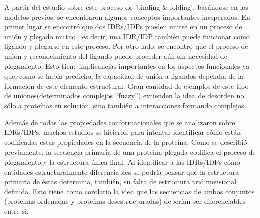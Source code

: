 A partir del estudio sobre este proceso de 'binding \& folding', basándose en los modelos previos, se encontraron algunos conceptos importantes inesperados.
En primer lugar se encontró que dos IDRs/IDPs pueden unirse en un proceso de unión y plegado mutuo \cite{bhattacherjee2012coupled},
es decir, una IDR/IDP también puede funcionar como ligando y plegarse en este proceso. 
Por otro lado, se encontró que el proceso de unión y reconocimiento del ligando puede proceder aún sin necesidad de plegamiento. 
Esto tiene implicancias importantes en los aspectos funcionales ya que, como se había predicho, la capacidad de unión a ligandos dependía de la formación de este elemento estructural.
Gran cantidad de ejemplos de este tipo de uniones(determinados complejos ``fuzzy'') extienden la idea de desorden no sólo a proteínas en solución, sino también a interacciones formando complejos. 













Además de todas las propiedades conformacionales que se analizaron sobre IDRs/IDPs,
muchos estudios se hicieron para intentar identificar cómo están codificadas estas propiedades en la secuencia de la proteína.
Como se describió previamente, la secuencia primaria de una proteina plegada codifica el proceso de plegamiento y la estructura única final. 
Al identificar a las IDRs/IDPs cómo entidades estructuralmente diferenciables se podría pensar que la estructura primaria de éstas determina, también, su falta de estructura tridimensional definida.
Esto tiene como corolario la idea que las secuencias de ambos conjuntos (proteinas ordenadas y proteínas desestructuradas) deberían ser diferenciables entre si.

